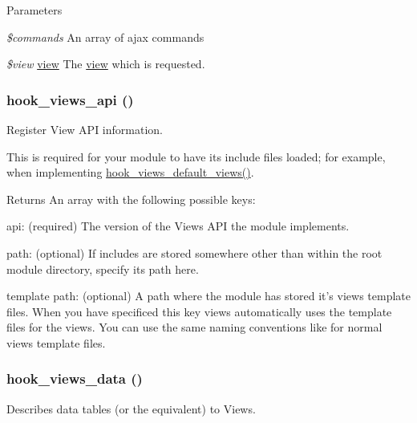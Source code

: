 \begin{DoxyParams}{Parameters}
\item[{\em \$commands}]An array of ajax commands \item[{\em \$view}]\hyperlink{classview}{view} The \hyperlink{classview}{view} which is requested. \end{DoxyParams}
\hypertarget{group__views__hooks_gac67ffd4a2f61f9814ee37b541c472c47}{
\subsubsection[{hook\_\-views\_\-api}]{\setlength{\rightskip}{0pt plus 5cm}hook\_\-views\_\-api ()}}
\label{group__views__hooks_gac67ffd4a2f61f9814ee37b541c472c47}
Register View API information.

This is required for your module to have its include files loaded; for example, when implementing \hyperlink{group__views__hooks_ga23edb74860682fa88f75cf94b97c2e15}{hook\_\-views\_\-default\_\-views()}.

\begin{DoxyReturn}{Returns}
An array with the following possible keys:
\begin{DoxyItemize}
\item api: (required) The version of the Views API the module implements.
\item path: (optional) If includes are stored somewhere other than within the root module directory, specify its path here.
\item template path: (optional) A path where the module has stored it's views template files. When you have specificed this key views automatically uses the template files for the views. You can use the same naming conventions like for normal views template files. 
\end{DoxyItemize}
\end{DoxyReturn}
\hypertarget{group__views__hooks_ga227057901681e4a33e33c199c7a8c989}{
\subsubsection[{hook\_\-views\_\-data}]{\setlength{\rightskip}{0pt plus 5cm}hook\_\-views\_\-data ()}}
\label{group__views__hooks_ga227057901681e4a33e33c199c7a8c989}
Describes data tables (or the equivalent) to Views.

